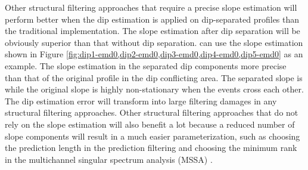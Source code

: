  Other structural filtering approaches that require a precise slope estimation will perform better when the dip estimation is applied on dip-separated profiles than the traditional implementation. The slope estimation after dip separation will be obviously superior than that without dip separation.  can use the slope estimation shown in Figure \ref{fig:dip1-emd0,dip2-emd0,dip3-emd0,dip4-emd0,dip5-emd0} as an example. The slope estimation in the separated dip components   more precise than that of the original profile in the dip conflicting area. The separated slope is  while the original slope is highly non-stationary when the events cross each other. The dip estimation error will transform into large filtering damages in any structural filtering approaches. Other structural filtering approaches that do not rely on the slope estimation will also benefit a lot because a reduced number of slope components will result in a much easier parameterization, such as choosing the prediction length in the prediction filtering \cite[]{yangkang2014} and choosing the minimum rank in the multichannel singular spectrum analysis (MSSA) \cite[]{mssa}.

\subsection{}
